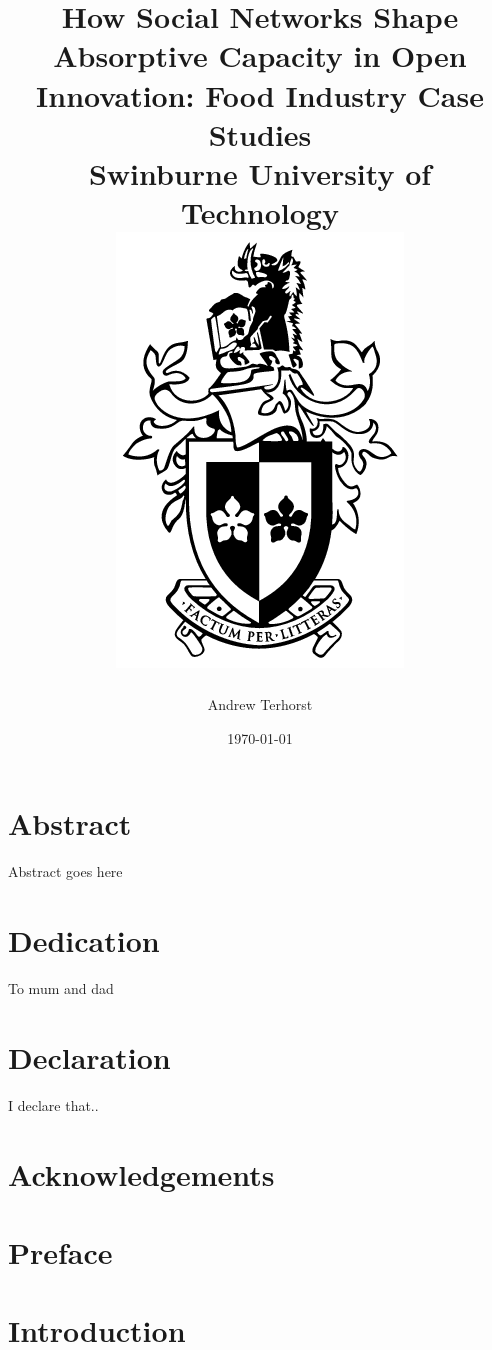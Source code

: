 \documentclass[12pt,twoside]{report}
\title{
	{How Social Networks Shape Absorptive Capacity in Open Innovation: Food Industry Case Studies}\\
	{\large Swinburne University of Technology}\\
	{\includegraphics[width=0.3\columnwidth]{swinburne_university_of_technology.png}}
}
\author{Andrew Terhorst}
\date{\today}
\begin{document}
\onehalfspacing
\maketitle
\renewcommand{\bibname}{References}

 

\chapter*{Abstract}

Abstract goes here

\chapter*{Dedication}
To mum and dad

\chapter*{Declaration}
I declare that..


\chapter*{Acknowledgements}

\tableofcontents

\chapter*{Preface}

\chapter{Introduction}

\end{document}
